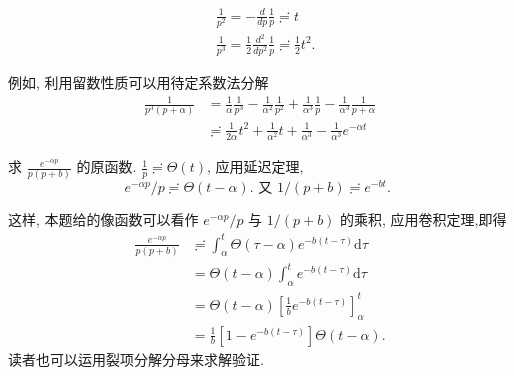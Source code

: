 $$    \begin{aligned}
    & \frac{1}{p^2}=-\frac{d}{d p} \frac{1}{p} \risingdotseq  t \\
    & \frac{1}{p^3}=\frac{1}{2} \frac{d^2}{d p^2} \frac{1}{p} \risingdotseq \frac{1}{2} t^2 .
    \end{aligned}$$


例如, 利用留数性质可以用待定系数法分解
$$
    \begin{aligned}
    \frac{1}{p^3(p+\alpha)} & =\frac{1}{\alpha} \frac{1}{p^3}-\frac{1}{\alpha^2} \frac{1}{p^2}+\frac{1}{\alpha^3} \frac{1}{p}-\frac{1}{\alpha^3} \frac{1}{p+\alpha} \\
    & \risingdotseq \frac{1}{2 \alpha} t^2+\frac{1}{\alpha^2} t+\frac{1}{\alpha^3}-\frac{1}{\alpha^3} e^{-\alpha t}
    \end{aligned}
$$

\begin{examplebox}{求 $\frac{e^{-\alpha p}}{p(p+b)}$ 的原函数.}
    $\frac{1}{p} \risingdotseq \Theta(t)$, 应用延迟定理,
    $$
e^{-\alpha p} / p \risingdotseq \Theta(t-\alpha) \text {. 又 } 1 /(p+b) \risingdotseq e^{-b t} \text {. }
$$

这样, 本题给的像函数可以看作 $e^{-\alpha p} / p$ 与 $1 /(p+b)$ 的乘积, 应用卷积定理,即得
$$
\begin{aligned}
\frac{e^{-\alpha p}}{p(p+b)} & \risingdotseq \int_\alpha^t \Theta(\tau-\alpha) e^{-b(t-\tau)} \mathrm{d} \tau \\
& =\Theta(t-\alpha) \int_\alpha^t e^{-b(t-\tau)} \mathrm{d} \tau \\
& =\Theta(t-\alpha)\left[\frac{1}{b} e^{-b(t-\tau)}\right]_\alpha^t \\
& =\frac{1}{b}\left[1-e^{-b(t-\tau)}\right] \Theta(t-\alpha) .
\end{aligned}
$$
读者也可以运用裂项分解分母来求解验证.
\end{examplebox}

